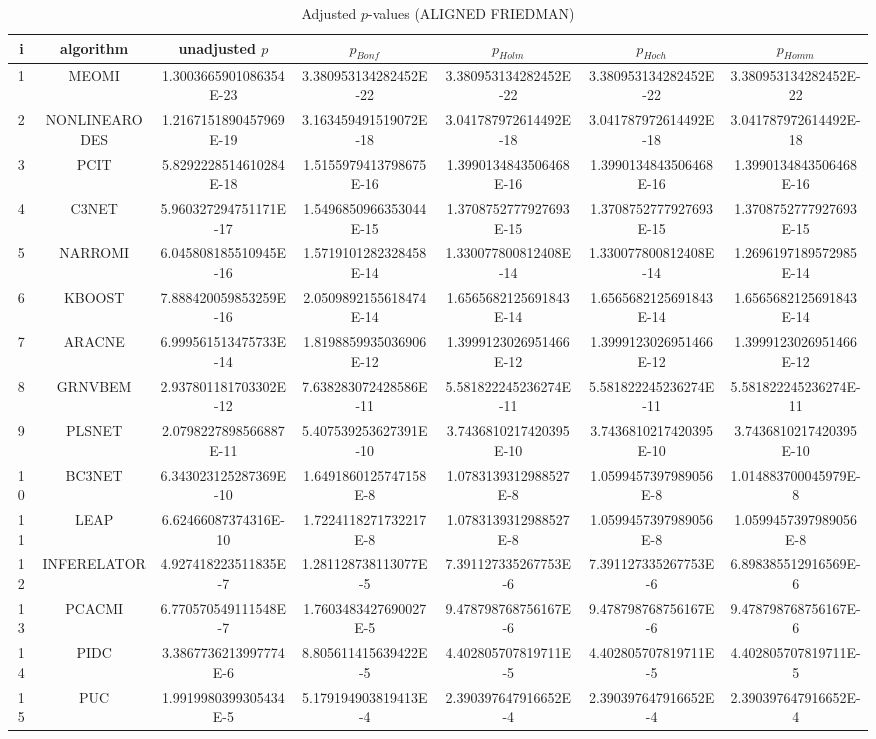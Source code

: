 \documentclass[a4paper,10pt]{article}
\begin{document}
\begin{landscape}
\begin{table}[!htp]
\centering\scriptsize
\caption{Adjusted $p$-values (ALIGNED FRIEDMAN)}
\begin{tabular}{ccccccc}
i&algorithm&unadjusted $p$&$p_{Bonf}$&$p_{Holm}$&$p_{Hoch}$&$p_{Homm}$\\
\hline
1&MEOMI&1.3003665901086354E-23&3.380953134282452E-22&3.380953134282452E-22&3.380953134282452E-22&3.380953134282452E-22\\
2&NONLINEARODES&1.2167151890457969E-19&3.163459491519072E-18&3.041787972614492E-18&3.041787972614492E-18&3.041787972614492E-18\\
3&PCIT&5.8292228514610284E-18&1.5155979413798675E-16&1.3990134843506468E-16&1.3990134843506468E-16&1.3990134843506468E-16\\
4&C3NET&5.960327294751171E-17&1.5496850966353044E-15&1.3708752777927693E-15&1.3708752777927693E-15&1.3708752777927693E-15\\
5&NARROMI&6.045808185510945E-16&1.5719101282328458E-14&1.330077800812408E-14&1.330077800812408E-14&1.2696197189572985E-14\\
6&KBOOST&7.888420059853259E-16&2.0509892155618474E-14&1.6565682125691843E-14&1.6565682125691843E-14&1.6565682125691843E-14\\
7&ARACNE&6.999561513475733E-14&1.8198859935036906E-12&1.3999123026951466E-12&1.3999123026951466E-12&1.3999123026951466E-12\\
8&GRNVBEM&2.937801181703302E-12&7.638283072428586E-11&5.581822245236274E-11&5.581822245236274E-11&5.581822245236274E-11\\
9&PLSNET&2.0798227898566887E-11&5.407539253627391E-10&3.7436810217420395E-10&3.7436810217420395E-10&3.7436810217420395E-10\\
10&BC3NET&6.343023125287369E-10&1.6491860125747158E-8&1.0783139312988527E-8&1.0599457397989056E-8&1.014883700045979E-8\\
11&LEAP&6.62466087374316E-10&1.7224118271732217E-8&1.0783139312988527E-8&1.0599457397989056E-8&1.0599457397989056E-8\\
12&INFERELATOR&4.927418223511835E-7&1.281128738113077E-5&7.391127335267753E-6&7.391127335267753E-6&6.898385512916569E-6\\
13&PCACMI&6.770570549111548E-7&1.7603483427690027E-5&9.478798768756167E-6&9.478798768756167E-6&9.478798768756167E-6\\
14&PIDC&3.3867736213997774E-6&8.805611415639422E-5&4.402805707819711E-5&4.402805707819711E-5&4.402805707819711E-5\\
15&PUC&1.9919980399305434E-5&5.179194903819413E-4&2.390397647916652E-4&2.390397647916652E-4&2.390397647916652E-4\\

\end{tabular}
\end{table}
\end{landscape}
\end{document}
